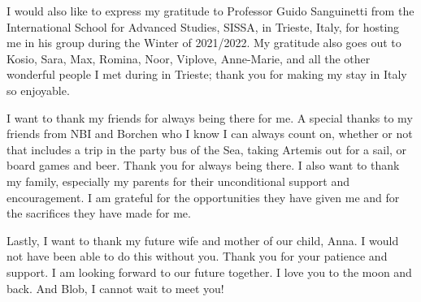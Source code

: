 I would also like to express my gratitude to Professor Guido Sanguinetti from the International School for Advanced Studies, SISSA, in Trieste, Italy, for hosting me in his group during the Winter of 2021/2022. My gratitude also goes out to Kosio, Sara, Max, Romina, Noor, Viplove, Anne-Marie, and all the other wonderful people I met during in Trieste; thank you for making my stay in Italy so enjoyable.

I want to thank my friends for always being there for me. A special thanks to my friends from NBI and Borchen who I know I can always count on, whether or not that includes a trip in the party bus of the Sea, taking Artemis out for a sail, or board games and beer. Thank you for always being there. I also want to thank my family, especially my parents for their unconditional support and encouragement. I am grateful for the opportunities they have given me and for the sacrifices they have made for me.

Lastly, I want to thank my future wife and mother of our child, Anna. I would not have been able to do this without you. Thank you for your patience and support. I am looking forward to our future together. I love you to the moon and back. And Blob, I cannot wait to meet you! 